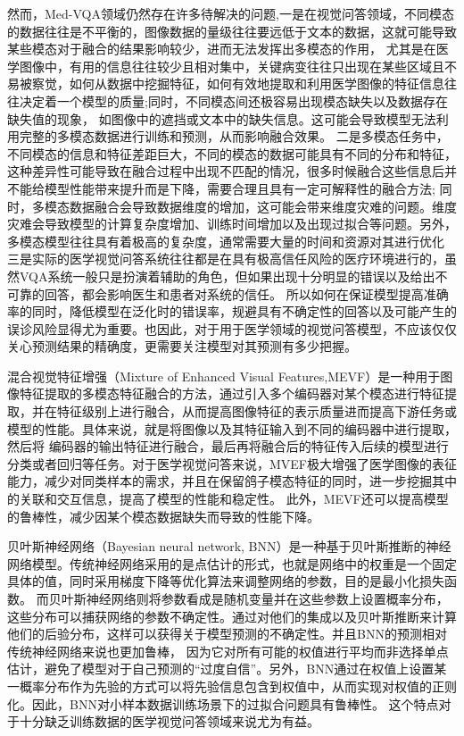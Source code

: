 然而，Med-VQA领域仍然存在许多待解决的问题,一是在视觉问答领域，不同模态的数据往往是不平衡的，图像数据的量级往往要远低于文本的数据，这就可能导致某些模态对于融合的结果影响较少，进而无法发挥出多模态的作用，
尤其是在医学图像中，有用的信息往往较少且相对集中，关键病变往往只出现在某些区域且不易被察觉，如何从数据中挖掘特征，如何有效地提取和利用医学图像的特征信息往往决定着一个模型的质量;同时，不同模态间还极容易出现模态缺失以及数据存在缺失值的现象，
如图像中的遮挡或文本中的缺失信息。这可能会导致模型无法利用完整的多模态数据进行训练和预测，从而影响融合效果。
二是多模态任务中，不同模态的信息和特征差距巨大，不同的模态的数据可能具有不同的分布和特征，这种差异性可能导致在融合过程中出现不匹配的情况，很多时候融合这些信息后并不能给模型性能带来提升而是下降，需要合理且具有一定可解释性的融合方法\cite{huang2021makes};
同时，多模态数据融合会导致数据维度的增加，这可能会带来维度灾难的问题。维度灾难会导致模型的计算复杂度增加、训练时间增加以及出现过拟合等问题。另外，多模态模型往往具有着极高的复杂度，通常需要大量的时间和资源对其进行优化
三是实际的医学视觉问答系统往往都是在具有极高信任风险的医疗环境进行的，虽然VQA系统一般只是扮演着辅助的角色，但如果出现十分明显的错误以及给出不可靠的回答，都会影响医生和患者对系统的信任。
所以如何在保证模型提高准确率的同时，降低模型在泛化时的错误率，规避具有不确定性的回答以及可能产生的误诊风险显得尤为重要。也因此，对于用于医学领域的视觉问答模型，不应该仅仅关心预测结果的精确度，更需要关注模型对其预测有多少把握。

混合视觉特征增强（Mixture of Enhanced Visual Features,MEVF）是一种用于图像特征提取的多模态特征融合的方法，通过引入多个编码器对某个模态进行特征提取，并在特征级别上进行融合，从而提高图像特征的表示质量进而提高下游任务或模型的性能。具体来说，就是将图像以及其特征输入到不同的编码器中进行提取，然后将
编码器的输出特征进行融合，最后再将融合后的特征传入后续的模型进行分类或者回归等任务。对于医学视觉问答来说，MVEF极大增强了医学图像的表征能力，减少对同类样本的需求，并且在保留鸽子模态特征的同时，进一步挖掘其中的关联和交互信息，提高了模型的性能和稳定性。
此外，MEVF还可以提高模型的鲁棒性，减少因某个模态数据缺失而导致的性能下降。

贝叶斯神经网络（Bayesian neural network, BNN）是一种基于贝叶斯推断的神经网络模型。传统神经网络采用的是点估计的形式，也就是网络中的权重是一个固定具体的值，同时采用梯度下降等优化算法来调整网络的参数，目的是最小化损失函数。
而贝叶斯神经网络则将参数看成是随机变量并在这些参数上设置概率分布，这些分布可以捕获网络的参数不确定性。通过对他们的集成以及贝叶斯推断来计算他们的后验分布，这样可以获得关于模型预测的不确定性。并且BNN的预测相对传统神经网络来说也更加鲁棒，
因为它对所有可能的权值进行平均而非选择单点估计，避免了模型对于自己预测的“过度自信”。另外，BNN通过在权值上设置某一概率分布作为先验的方式可以将先验信息包含到权值中，从而实现对权值的正则化。因此，BNN对小样本数据训练场景下的过拟合问题具有鲁棒性。
这个特点对于十分缺乏训练数据的医学视觉问答领域来说尤为有益。

